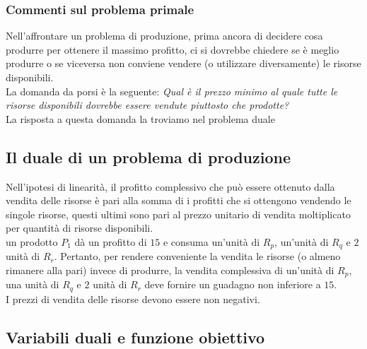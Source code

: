 \documentclass[12pt,a4paper]{article}
\begin{document}
\subsubsection{Commenti sul problema primale}
Nell'affrontare un problema di produzione, prima ancora di decidere cosa produrre per ottenere il massimo profitto, ci si dovrebbe chiedere se è meglio produrre o se viceversa non conviene vendere (o utilizzare diversamente) le risorse disponibili.\\
La domanda da porsi è la seguente: \textsl{Qual è il prezzo minimo al quale tutte le risorse disponibili dovrebbe essere vendute piuttosto che prodotte?}\\
La risposta a questa domanda la troviamo nel problema duale

\subsection{Il duale di un problema di produzione}
Nell'ipotesi di linearità, il profitto complessivo che può essere ottenuto dalla vendita delle risorse è pari alla somma di i profitti che si ottengono vendendo le singole risorse, questi ultimi sono pari al prezzo unitario di vendita moltiplicato per quantità di risorse disponibili.\\
un prodotto $P_1$ dà un profitto di $15$ e consuma un'unità di $R_p$, un'unità di $R_q$ e $2$ unità di $R_r$. Pertanto, per rendere conveniente la vendita le risorse (o almeno rimanere alla pari) invece di produrre, la vendita complessiva di un'unità di $R_p$, una unità di $R_q$ e $2$ unità di $R_r$ deve fornire un guadagno non inferiore a $15$.\\
I prezzi di vendita delle risorse devono essere non negativi.

\subsection{Variabili duali e funzione obiettivo}
\begin{Parallel}{0.45 \textwidth}{0.45 \textwidth}
\end{Parallel}
\end{document}
